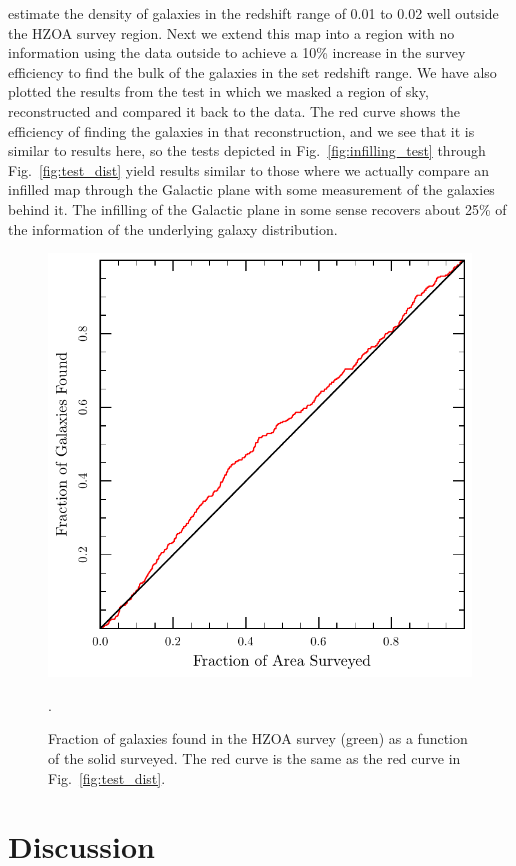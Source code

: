 \documentclass[useAMS,usenatbib]{mn2e}
\begin{document}
estimate the density of galaxies in the redshift range of 0.01 to 0.02
well outside the HZOA survey region.  Next we extend this map into a
region with no information using the data outside to achieve a 10\%
increase in the survey efficiency to find the bulk of the galaxies in
the set redshift range.  We have also plotted the results from the
test in which we masked a region of sky, reconstructed and compared it
back to the data.  The red curve shows the efficiency of finding the
galaxies in that reconstruction, and we see that it is similar to
results here, so the tests depicted in Fig.~\ref{fig:infilling_test}
through Fig.~\ref{fig:test_dist} yield results similar to those where
we actually compare an infilled map through the Galactic plane with
some measurement of the galaxies behind it.  The infilling of the
Galactic plane in some sense recovers about 25\% of the information
of the underlying galaxy distribution.
\begin{figure}
  \includegraphics[width=\columnwidth]{hzoa_cum}
  \caption{Fraction of galaxies found in the HZOA survey (green) as a function of the solid surveyed.  The red curve is the same as the red curve in Fig.~\ref{fig:test_dist}.}.
  \label{fig:hzoa_cum}
\end{figure}



\section{Discussion}
\label{sec:discussion}





\label{lastpage}
\end{document}
